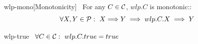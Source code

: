 \begin{theorem}{wlp-mono}[Monotonicity]~{\normalfont\cite{dijkstra90}} For any $C\in\mathcal{C}$, $wlp.C$ is monotonic::
  \[\forall X, Y \in\P:\ X{\implies} Y \implies wlp.C.X\implies Y\]
\end{theorem}

\begin{theorem}{wlp-true}~{\normalfont\cite{dijkstra90}}
  $\forall C\in\mathcal{C}:\ wlp.C.true = true$
\end{theorem}




